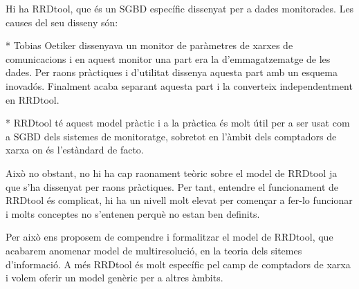 







Hi ha RRDtool, que és un SGBD específic dissenyat per a dades monitorades. Les causes del seu disseny són:

* Tobias Oetiker dissenyava un monitor de paràmetres de xarxes de comunicacions i en aquest monitor una part era la d'emmagatzematge de les dades. Per raons pràctiques i d'utilitat dissenya aquesta part amb un esquema inovadós. Finalment acaba separant aquesta part i la converteix independentment en RRDtool.

* RRDtool té aquest model pràctic i a la pràctica és molt útil per a ser usat com a SGBD dels sistemes de monitoratge, sobretot en l'àmbit dels comptadors de xarxa on és l'estàndard de facto. 

Això no obstant, no hi ha cap raonament teòric sobre el model de RRDtool ja que s'ha dissenyat per raons pràctiques. Per tant, entendre el funcionament de RRDtool és complicat, hi ha un nivell molt elevat per començar a fer-lo funcionar i molts conceptes no s'entenen perquè no estan ben definits. 

Per això ens proposem de compendre i formalitzar el model de RRDtool, que acabarem anomenar model de multiresolució, en la teoria dels sitemes d'informació. A més RRDtool és molt específic pel camp de comptadors de xarxa i volem oferir un model genèric per a altres àmbits.  









